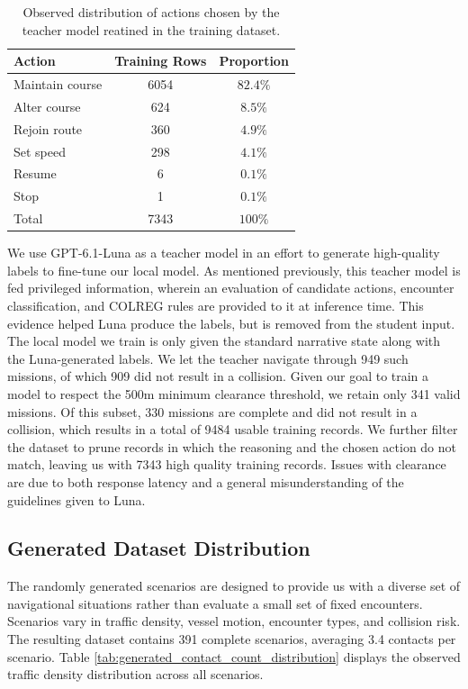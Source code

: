 \documentclass[10pt]{reportMaster}
\begin{document}
\begin{table}[htbp]
    \centering
    \begin{tabular}{l c c}
        \hline
        \textbf{Action} & \textbf{Training Rows} &
        \textbf{Proportion} \\
        \hline
        Maintain course & 6054 & $82.4\%$ \\
        Alter course & 624 & $8.5\%$ \\
        Rejoin route & 360 & $4.9\%$ \\
        Set speed & 298 & $4.1\%$ \\
        Resume & 6 & $0.1\%$ \\
        Stop & 1 & $0.1\%$ \\
        \hline
        Total & 7343 & $100\%$ \\
        \hline
    \end{tabular}
    \caption{Observed distribution of actions chosen by the teacher model reatined in the training dataset.}
    \label{tab:generated_action_type_tr}
\end{table}

We use GPT-6.1-Luna as a teacher model in an effort to generate high-quality labels to fine-tune our local model. As mentioned previously, this teacher model is fed privileged information, wherein an evaluation of candidate actions, encounter classification, and COLREG rules are provided to it at inference time. This evidence helped Luna produce the labels, but is removed from the student input. The local model we train is only given the standard narrative state along with the Luna-generated labels. We let the teacher navigate through 949 such missions, of which 909 did not result in a collision. Given our goal to train a model to respect the 500m minimum clearance threshold, we retain only 341 valid missions. Of this subset, 330 missions are complete and did not result in a collision, which results in a total of 9484 usable training records. We further filter the dataset to prune records in which the reasoning and the chosen action do not match, leaving us with 7343 high quality training records. Issues with clearance are due to both response latency and a general misunderstanding of the guidelines given to Luna. 

\subsection{Generated Dataset Distribution}

The randomly generated scenarios are designed to provide us with a diverse set of navigational situations rather than evaluate a small set of fixed encounters. Scenarios vary in traffic density, vessel motion, encounter types, and collision risk. The resulting dataset contains 391 complete scenarios, averaging 3.4 contacts per scenario. Table \ref{tab:generated_contact_count_distribution} displays the observed traffic density distribution across all scenarios. 
\end{document}
